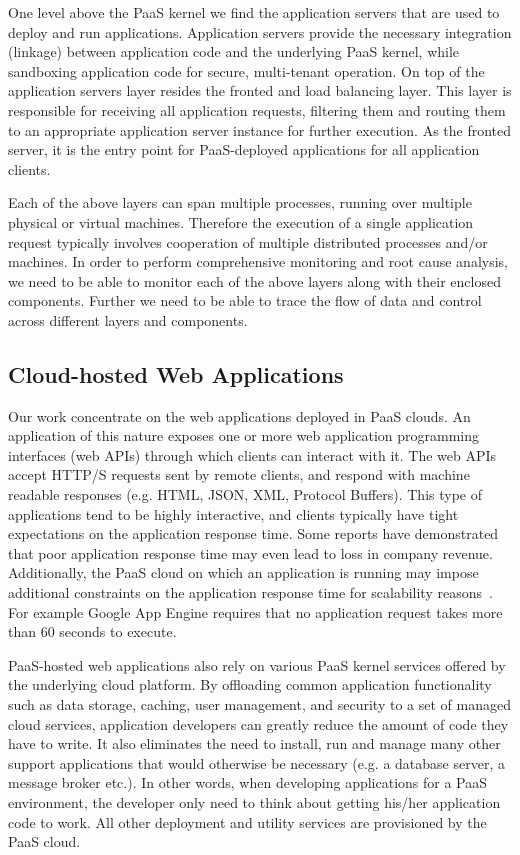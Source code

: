 One level above the PaaS kernel we find the application servers that are used to deploy and run
applications. Application servers provide the necessary integration (linkage) between application code and the
underlying PaaS kernel, while sandboxing application code for secure, multi-tenant operation. On top
of the application servers layer resides the fronted and load balancing layer. This layer is responsible
for receiving all application requests, filtering them and routing them to an appropriate application
server instance for further execution. As the fronted server, it is the entry point for PaaS-deployed
applications for all application clients.

Each of the above layers can span multiple processes, running over multiple physical or virtual
machines. Therefore the execution of a single application request typically involves cooperation
of multiple distributed processes and/or machines. In order to perform comprehensive monitoring
and root cause analysis, we need to be able to monitor each of the above layers along with their
enclosed components. Further we need to be able to trace the flow of data and control
across different layers and components.

\subsection{Cloud-hosted Web Applications}
Our work concentrate on the web applications deployed in PaaS clouds. An application of this nature
exposes one or more web application programming interfaces (web APIs) through which clients can
interact with it. The web APIs accept HTTP/S requests sent by remote clients, and respond with
machine readable responses (e.g. HTML, JSON, XML, Protocol Buffers). This type of applications tend to be highly
interactive, and clients typically have tight expectations on the application response time. Some
reports have demonstrated that poor application response time may even lead to loss in company
revenue. Additionally, the PaaS 
cloud on which an application is running may impose additional constraints on the application
response time for scalability reasons~\cite{azure-limits,gae-limits}. 
For example Google App Engine requires that no application
request takes more than 60 seconds to execute.

PaaS-hosted web applications also rely on various PaaS kernel services offered by the underlying
cloud platform. By offloading common application functionality such as data storage, caching,
user management, and security to a set of managed cloud services, application developers
can greatly reduce the amount of code they have to write. It also eliminates the need to install, run and
manage many other support applications that would otherwise be necessary (e.g. a database server, 
a message broker etc.). In other words, when developing applications for a PaaS environment, the
developer only need to think about getting his/her application code to work. All other deployment
and utility services are provisioned by the PaaS cloud. 


